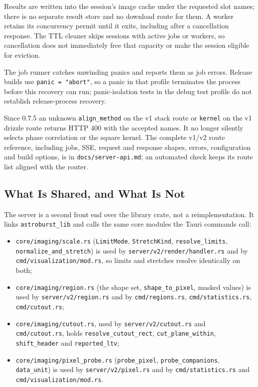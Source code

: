 \documentclass[11pt,a4paper]{article}
\newcommand{\code}[1]{\texttt{\small #1}}
\begin{document}
    Results are written into the session's image cache under the requested slot names; there is no separate result store and no download route for them. A worker retains its concurrency permit until it exits, including after a cancellation response. The TTL cleaner skips sessions with active jobs or workers, so cancellation does not immediately free that capacity or make the session eligible for eviction.

    The job runner catches unwinding panics and reports them as job errors. Release builds use \code{panic = "abort"}, so a panic in that profile terminates the process before this recovery can run; panic-isolation tests in the debug test profile do not establish release-process recovery.

    Since 0.7.5 an unknown \code{align\_method} on the v1 stack route or \code{kernel} on the v1 drizzle route returns HTTP 400 with the accepted names. It no longer silently selects phase correlation or the square kernel. The complete v1/v2 route reference, including jobs, SSE, request and response shapes, errors, configuration and build options, is in \code{docs/server-api.md}; an automated check keeps its route list aligned with the router.

    \subsection{What Is Shared, and What Is Not}

    The server is a second front end over the library crate, not a reimplementation. It links \code{astroburst\_lib} and calls the same core modules the Tauri commands call:

    \begin{itemize}[nosep]
        \item \code{core/imaging/scale.rs} (\code{LimitMode}, \code{StretchKind}, \code{resolve\_limits}, \code{normalize\_and\_stretch}) is used by \code{server/v2/render/handler.rs} and by \code{cmd/visualization/mod.rs}, so limits and stretches resolve identically on both;
        \item \code{core/imaging/region.rs} (the shape set, \code{shape\_to\_pixel}, masked values) is used by \code{server/v2/region.rs} and by \code{cmd/regions.rs}, \code{cmd/statistics.rs}, \code{cmd/cutout.rs};
        \item \code{core/imaging/cutout.rs}, used by \code{server/v2/cutout.rs} and \code{cmd/cutout.rs}, holds \code{resolve\_cutout\_rect}, \code{cut\_plane\_within}, \code{shift\_header} and \code{reported\_ltv};
        \item \code{core/imaging/pixel\_probe.rs} (\code{probe\_pixel}, \code{probe\_companions}, \code{data\_unit}) is used by \code{server/v2/pixel.rs} and by \code{cmd/statistics.rs} and \code{cmd/visualization/mod.rs}.
    \end{itemize}
\end{document}
